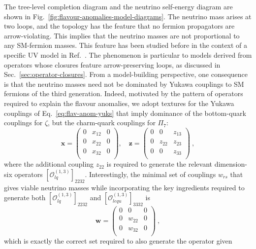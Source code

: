 The tree-level completion diagram and the neutrino self-energy diagram are shown
in Fig.~\ref{fig:flavour-anomalies-model-diagrams}. The neutrino mass arises at
two loops, and the topology has the feature that no fermion propagators are
arrow-violating. This implies that the neutrino masses are not proportional to
any SM-fermion masses. This feature has been studied before in the context of a
specific UV model in Ref.~\cite{Gargalionis:2019drk}. The phenomenon is
particular to models derived from operators whose closures feature
arrow-preserving loops, as discussed in Sec.~\ref{sec:operator-closures}. From a
model-building perspective, one consequence is that the neutrino masses need not
be dominated by Yukawa couplings to SM fermions of the third generation. Indeed,
motivated by the pattern of operators required to explain the flavour anomalies,
we adopt textures for the Yukawa couplings of Eq.~\eqref{eq:flav-anom-yuks} that
imply dominance of the bottom-quark couplings for $\zeta$, but the charm-quark
couplings for $\Pi_{7}$:
\begin{equation}
  \mathbf{x} = \begin{pmatrix}
    0 & x_{12} & 0 \\
    0 & x_{22} & 0 \\
    0 & x_{32} & 0 \\
  \end{pmatrix},\quad \mathbf{z} = \begin{pmatrix}
    0 & 0 & z_{13} \\
    0 & z_{22} & z_{23} \\
    0 & 0 & z_{33} \\
  \end{pmatrix} \ ,
\end{equation}
where the additional coupling $z_{22}$ is required to generate the relevant
dimension-six operators $[\mathcal{O}_{lq}^{(1,3)}]_{2232}$. Interestingly, the
minimal set of couplings $w_{rs}$ that gives viable neutrino masses while
incorporating the key ingredients required to generate both
$[\mathcal{O}_{lq}^{(1,3)}]_{2232}$ and $[\mathcal{O}_{lequ}^{(1,3)}]_{3332}$ is
\begin{equation}
  \mathbf{w} = \begin{pmatrix}
    0 & 0 & 0 \\
    0 & w_{22} & 0 \\
    0 & w_{32} & 0 \\
    \end{pmatrix} \ ,
  \end{equation}
  which is exactly the correct set required to also generate the operator given
